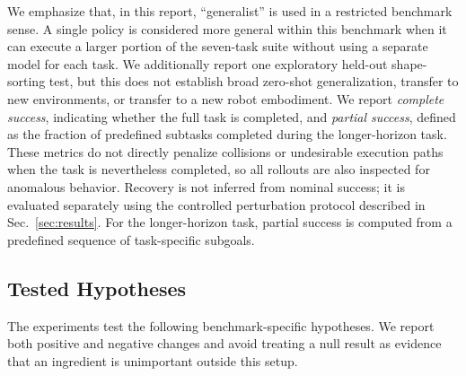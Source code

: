 \documentclass[10pt,conference]{IEEEtran}
\begin{document}
We emphasize that, in this report, ``generalist'' is used in a restricted benchmark sense. A
single policy is considered more general within this benchmark when it can execute a
larger portion of the seven-task suite without using a separate model for each
task. We additionally report one exploratory held-out shape-sorting test, but this does
not establish broad zero-shot generalization, transfer to new environments, or
transfer to a new robot embodiment. We report
\emph{complete success}, indicating whether the full task is completed, and
\emph{partial success}, defined as the fraction of predefined subtasks completed
during the longer-horizon task. These metrics do not directly penalize collisions
or undesirable execution paths when the task is nevertheless completed, so all
rollouts are also inspected for anomalous behavior. Recovery is not inferred
from nominal success; it is evaluated separately using the controlled
perturbation protocol described in Sec.~\ref{sec:results}. For the longer-horizon
task, partial success is computed from a predefined sequence of task-specific
subgoals.

\subsection{Tested Hypotheses}

The experiments test the following benchmark-specific hypotheses. We report
both positive and negative changes and avoid treating a null result as evidence
that an ingredient is unimportant outside this setup.
\end{document}

